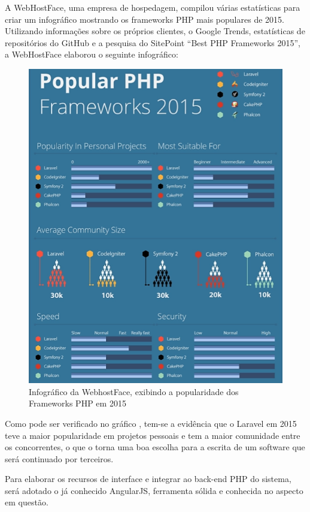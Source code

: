 A WebHostFace, uma empresa de hospedagem, compilou várias estatísticas para criar um infográfico mostrando os frameworks PHP mais populares de 2015. Utilizando informações sobre os próprios clientes, o Google Trends, estatísticas de repositórios do GitHub e a pesquisa do SitePoint “Best PHP Frameworks 2015”, a WebHostFace elaborou o seguinte infográfico: 
\begin{figure}
	\label{fig:graficoWebhostface}
	\includegraphics[width=1\textwidth]{img/infografico_webhostface}
	\caption{Infográfico da WebhostFace, exibindo a popularidade dos Frameworks PHP em 2015}
\end{figure}

Como pode ser verificado no gráfico \cite{WebhostFace-PHP-Frameworks}, tem-se a evidência que o Laravel em 2015 teve a maior popularidade em projetos pessoais e tem a maior comunidade entre os concorrentes, o que o torna uma boa escolha para a escrita de um software que será continuado por terceiros.


Para elaborar os recursos de interface e integrar ao back-end PHP do sistema, será adotado o já conhecido AngularJS, ferramenta sólida e conhecida no aspecto em questão. 


